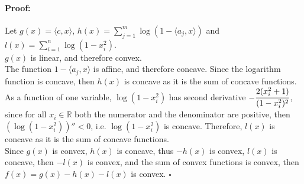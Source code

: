 \documentclass[10pt]{article}
\begin{document}
\paragraph{Proof:}

Let $g(x) = \langle c, x \rangle$, $h(x) = \displaystyle\sum_{j=1}^m \log(1 - \langle a_j, x \rangle)$ and $l(x) = \displaystyle\sum_{i=1}^n \log(1- x_i^2)$.\\

$g(x)$ is linear, and therefore convex.\\

The function $1 - \langle a_j, x \rangle$ is affine, and therefore concave. Since the logarithm function is concave, then $h(x)$ is concave as it is the sum of concave functions.\\

As a function of one variable, $\log(1-x_i^2)$ has second derivative $- \cfrac{2(x_i^2 + 1)}{(1-x_i^2)^2}$, since for all $x_i \in \mathbb{R}$ both the numerator and the denominator are positive, then $(\log(1-x_i^2))'' < 0$, i.e. $\log(1-x_i^2)$ is concave. Therefore, $l(x)$ is concave as it is the sum of concave functions.\\

Since $g(x)$ is convex, $h(x)$ is concave, thus $-h(x)$ is convex, $l(x)$ is concave, then $-l(x)$ is convex, and the sum of convex functions is convex, then $f(x) = g(x) - h(x) - l(x)$ is convex. $\square$
\end{document}
